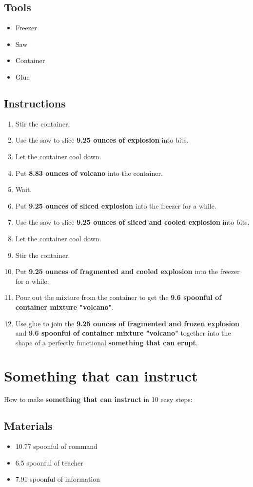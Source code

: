 \documentclass{article}
\begin{document}
\subsection{Tools}\begin{itemize}
\item 
Freezer
\item 
Saw
\item 
Container
\item 
Glue
\end{itemize}
\subsection{Instructions}\begin{enumerate}
\item 
Stir the container.
\item 
Use the saw to slice \textbf{9.25 ounces of explosion} into bits.
\item 
Let the container cool down.
\item 
Put \textbf{8.83 ounces of volcano} into the container.
\item 
Wait.
\item 
Put \textbf{9.25 ounces of sliced explosion} into the freezer for a while.
\item 
Use the saw to slice \textbf{9.25 ounces of sliced and cooled explosion} into bits.
\item 
Let the container cool down.
\item 
Stir the container.
\item 
Put \textbf{9.25 ounces of fragmented and cooled explosion} into the freezer for a while.
\item 
Pour out the mixture from the container to get the \textbf{9.6 spoonful of container mixture "volcano"}.
\item 
Use glue to join the \textbf{9.25 ounces of fragmented and frozen explosion} and \textbf{9.6 spoonful of container mixture "volcano"} together into the shape of a perfectly functional \textbf{something that can erupt}.
\end{enumerate}
\newpage
\section{Something that can instruct}How to make \textbf{something that can instruct} in 10 easy steps:

\subsection{Materials}\begin{itemize}
\item 
10.77 spoonful of command
\item 
6.5 spoonful of teacher
\item 
7.91 spoonful of information
\end{itemize}
\end{document}

